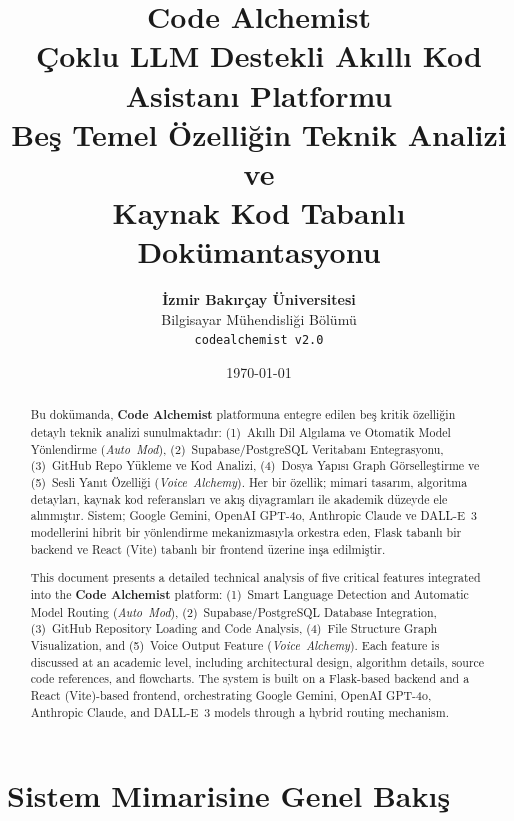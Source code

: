 \documentclass[12pt,a4paper]{article}
\title{
    \vspace{-1cm}
    \texorpdfstring{\textbf{\Huge Code Alchemist}}{Code Alchemist} \\[0.3cm]
    \Large Çoklu LLM Destekli Akıllı Kod Asistanı Platformu \\[0.5cm]
    \large Beş Temel Özelliğin Teknik Analizi ve \\Kaynak Kod Tabanlı Dokümantasyonu
}
\author{
    \textbf{İzmir Bakırçay Üniversitesi} \\
    Bilgisayar Mühendisliği Bölümü \\[0.3cm]
    \texorpdfstring{\texttt{code\textunderscore alchemist v2.0}}{code-alchemist}
}
\date{\today}
\begin{document}
\maketitle
\thispagestyle{empty}

\begin{abstract}
Bu dokümanda, \textbf{Code Alchemist} platformuna entegre edilen beş kritik özelliğin detaylı teknik analizi sunulmaktadır: (1)~Akıllı Dil Algılama ve Otomatik Model Yönlendirme (\textit{Auto~Mod}), (2)~Supabase/PostgreSQL Veritabanı Entegrasyonu, (3)~GitHub Repo Yükleme ve Kod Analizi, (4)~Dosya Yapısı Graph Görselleştirme ve (5)~Sesli Yanıt Özelliği (\textit{Voice~Alchemy}). Her bir özellik; mimari tasarım, algoritma detayları, kaynak kod referansları ve akış diyagramları ile akademik düzeyde ele alınmıştır. Sistem; Google Gemini, OpenAI GPT-4o, Anthropic Claude ve DALL-E~3 modellerini hibrit bir yönlendirme mekanizmasıyla orkestra eden, Flask tabanlı bir backend ve React (Vite) tabanlı bir frontend üzerine inşa edilmiştir.
\end{abstract}

\begin{otherlanguage}{english}
\begin{abstract}
This document presents a detailed technical analysis of five critical features integrated into the \textbf{Code Alchemist} platform: (1)~Smart Language Detection and Automatic Model Routing (\textit{Auto~Mod}), (2)~Supabase/PostgreSQL Database Integration, (3)~GitHub Repository Loading and Code Analysis, (4)~File Structure Graph Visualization, and (5)~Voice Output Feature (\textit{Voice~Alchemy}). Each feature is discussed at an academic level, including architectural design, algorithm details, source code references, and flowcharts. The system is built on a Flask-based backend and a React (Vite)-based frontend, orchestrating Google Gemini, OpenAI GPT-4o, Anthropic Claude, and DALL-E~3 models through a hybrid routing mechanism.
\end{abstract}
\end{otherlanguage}


\newpage
\tableofcontents
\newpage

\section{Sistem Mimarisine Genel Bakış}
\label{sec:architecture}
\end{document}
